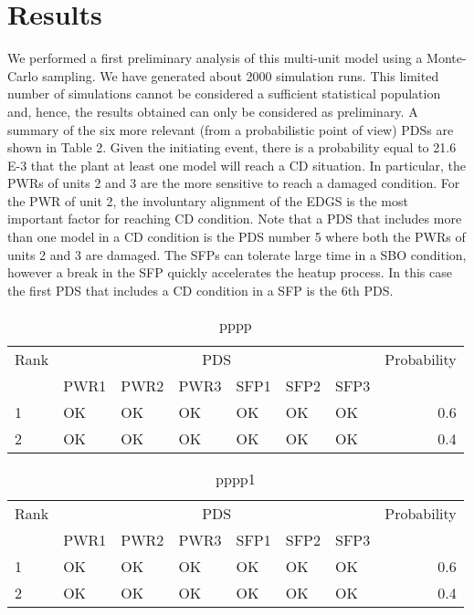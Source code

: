 \section{Results}
\label{sec:results}

We performed a first preliminary analysis of this multi-unit model using a Monte-Carlo sampling. 
We have generated about 2000 simulation runs.  This limited number of simulations cannot be considered 
a sufficient statistical population and, hence, the results obtained can only be considered as preliminary.
A summary of the six more relevant (from a probabilistic point of view) PDSs are shown in Table 2. 
Given the initiating event, there is a probability equal to 21.6 E-3 that the plant at least one model 
will reach a CD situation. In particular, the PWRs of units 2 and 3 are the more sensitive to reach a 
damaged condition. For the PWR of unit 2, the involuntary alignment of the EDGS is the most important 
factor for reaching CD condition.
Note that a PDS that includes more than one model in a CD condition is the PDS number 5 where both the 
PWRs of units 2 and 3 are damaged.
The SFPs can tolerate large time in a SBO condition, however a break in the SFP quickly accelerates 
the heatup process. In this case the first PDS that includes a CD condition in a SFP is the 6th PDS.

\begin{table}
  \centering
  \begin{tabular}{lllllllr}
    \hline
    Rank & \multicolumn{6}{c}{PDS} & Probability           \\
    \cline{2-7}
         & PWR1 & PWR2 & PWR3 & SFP1 & SFP2 & SFP3 &       \\
    \hline \hline
     1   & OK   & OK   & OK   & OK   & OK   & OK   & 0.6   \\
     2   & OK   & OK   & OK   & OK   & OK   & OK   & 0.4   \\
    \hline
  \end{tabular}
  \caption{pppp}
  \label{tab:resultsMain}
\end{table}

\begin{table}
  \centering
  \begin{tabular}{lllllllr}
    \hline
    Rank & \multicolumn{6}{c}{PDS} & Probability           \\
    \cline{2-7}
         & PWR1 & PWR2 & PWR3 & SFP1 & SFP2 & SFP3 &       \\
    \hline \hline
     1   & OK   & OK   & OK   & OK   & OK   & OK   & 0.6   \\
     2   & OK   & OK   & OK   & OK   & OK   & OK   & 0.4   \\
    \hline
  \end{tabular}
  \caption{pppp1}
  \label{tab:results1}
\end{table}

